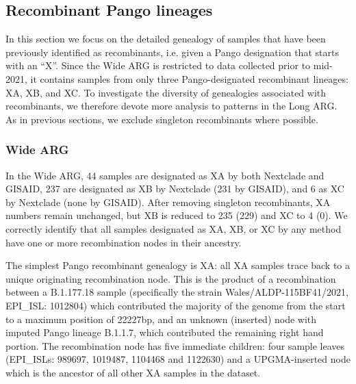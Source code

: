 \documentclass{article}
\begin{document}
\subsection{Recombinant Pango lineages}
\label{sec:pango_x_lineages}

In this section we focus on the detailed genealogy of samples that have been
previously identified as recombinants, i.e. given a Pango designation that
starts with an ``X''. Since the Wide ARG is restricted to data collected prior
to mid-2021, it contains samples from only three Pango-designated recombinant
lineages: XA, XB, and XC. To investigate the diversity of genealogies
associated with recombinants, we therefore devote more analysis to patterns in
the Long ARG. As in previous sections, we exclude singleton recombinants where
possible.

\subsubsection{Wide ARG}
In the Wide ARG, 44
samples are designated as XA by both Nextclade and GISAID, 237 are designated
as XB by Nextclade (231 by GISAID), and 6 as XC by Nextclade (none by GISAID).
After removing singleton recombinants, XA numbers remain unchanged, but XB is
reduced to 235 (229) and XC to 4 (0). We correctly identify that all samples
designated as XA, XB, or XC by any method have one or more recombination nodes
in their ancestry.

The simplest Pango recombinant genealogy is XA: all XA samples trace back to a
unique originating recombination node. This is the product of a recombination
between a B.1.177.18 sample (specifically the strain Wales/ALDP-115BF41/2021,
EPI\_ISL: 1012804) which contributed the majority of the genome from the start
to a maximum position of 22227bp, and an unknown (inserted) node with imputed
Pango lineage B.1.1.7, which contributed the remaining right hand portion. The
recombination node has five immediate children: four sample leaves (EPI\_ISLs:
989697, 1019487, 1104468 and 1122630) and a UPGMA-inserted node which is the
ancestor of all other XA samples in the dataset.
\end{document}
